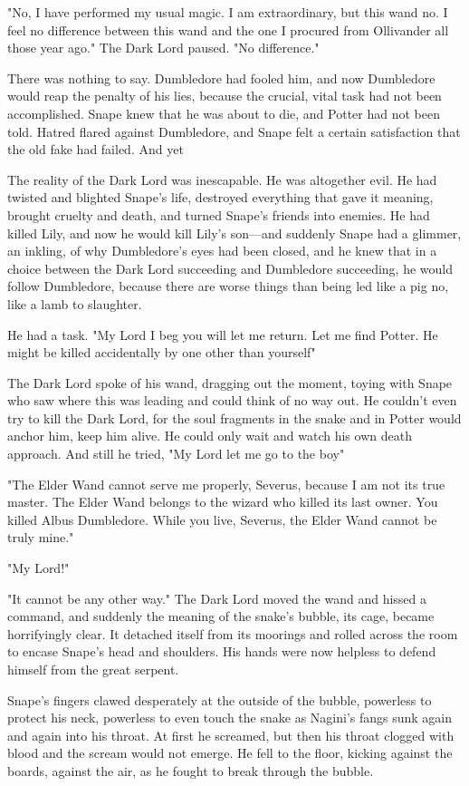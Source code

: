 "No, I have performed my usual magic. I am extraordinary, but this wand{\el} no. I feel no difference between this wand and the one I procured from Ollivander all those year ago." The Dark Lord paused. "No difference."

There was nothing to say. Dumbledore had fooled him, and now Dumbledore would reap the penalty of his lies, because the crucial, vital task had not been accomplished. Snape knew that he was about to die, and Potter had not been told. Hatred flared against Dumbledore, and Snape felt a certain satisfaction that the old fake had failed. And yet{\el}

The reality of the Dark Lord was inescapable. He was altogether evil. He had twisted and blighted Snape's life, destroyed everything that gave it meaning, brought cruelty and death, and turned Snape's friends into enemies. He had killed Lily, and now he would kill Lily's son—and suddenly Snape had a glimmer, an inkling, of why Dumbledore's eyes had been closed, and he knew that in a choice between the Dark Lord succeeding and Dumbledore succeeding, he would follow Dumbledore, because there are worse things than being led like a pig{\el} no, like a lamb{\el} to slaughter.

He had a task. "My Lord{\el} I beg you will let me return. Let me find Potter. He might be killed accidentally by one other than yourself{\el}"

The Dark Lord spoke of his wand, dragging out the moment, toying with Snape who saw where this was leading and could think of no way out. He couldn't even try to kill the Dark Lord, for the soul fragments in the snake and in Potter would anchor him, keep him alive. He could only wait and watch his own death approach. And still he tried, "My Lord{\el} let me go to the boy{\el}"

"The Elder Wand cannot serve me properly, Severus, because I am not its true master. The Elder Wand belongs to the wizard who killed its last owner. You killed Albus Dumbledore. While you live, Severus, the Elder Wand cannot be truly mine."

"My Lord!"

"It cannot be any other way." The Dark Lord moved the wand and hissed a command, and suddenly the meaning of the snake's bubble, its cage, became horrifyingly clear. It detached itself from its moorings and rolled across the room to encase Snape's head and shoulders. His hands were now helpless to defend himself from the great serpent.

Snape's fingers clawed desperately at the outside of the bubble, powerless to protect his neck, powerless to even touch the snake as Nagini's fangs sunk again and again into his throat. At first he screamed, but then his throat clogged with blood and the scream would not emerge. He fell to the floor, kicking against the boards, against the air, as he fought to break through the bubble.


